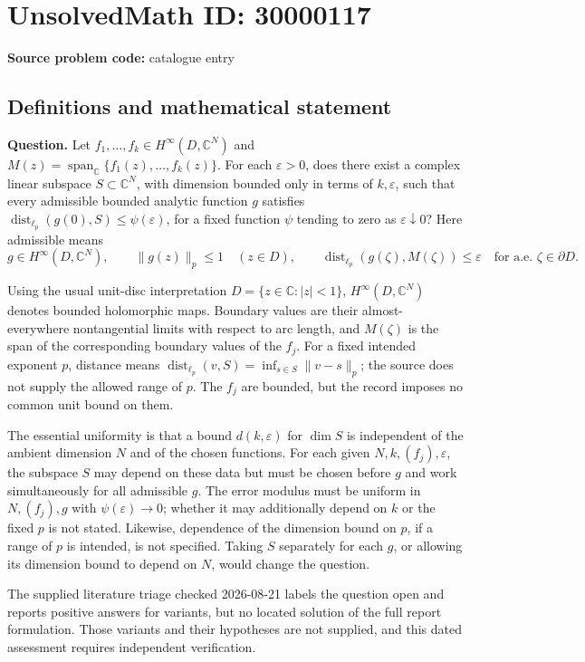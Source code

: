 \documentclass[11pt]{article}
\newcommand{\C}{\mathbb{C}}
\begin{document}
\section*{UnsolvedMath ID: 30000117}
\textbf{Source problem code:} catalogue entry
\subsection{Definitions and mathematical statement}
\textbf{Question.} Let \(f_1,\ldots,f_k\in H^\infty(D,\C^N)\) and \(M(z)=\operatorname{span}_{\C}\{f_1(z),\ldots,f_k(z)\}\). For each \(\varepsilon>0\), does there exist a complex linear subspace \(S\subset\C^N\), with dimension bounded only in terms of \(k,\varepsilon\), such that every admissible bounded analytic function \(g\) satisfies \(\operatorname{dist}_{\ell_p}(g(0),S)\le\psi(\varepsilon)\), for a fixed function \(\psi\) tending to zero as \(\varepsilon\downarrow0\)? Here admissible means\[g\in H^\infty(D,\C^N),\qquad \|g(z)\|_p\le1\quad(z\in D),\qquad \operatorname{dist}_{\ell_p}(g(\zeta),M(\zeta))\le\varepsilon\quad\text{for a.e. }\zeta\in\partial D.\]\par Using the usual unit-disc interpretation \(D=\{z\in\C:|z|<1\}\), \(H^\infty(D,\C^N)\) denotes bounded holomorphic maps. Boundary values are their almost-everywhere nontangential limits with respect to arc length, and \(M(\zeta)\) is the span of the corresponding boundary values of the \(f_j\). For a fixed intended exponent \(p\), distance means \(\operatorname{dist}_{\ell_p}(v,S)=\inf_{s\in S}\|v-s\|_p\); the source does not supply the allowed range of \(p\). The \(f_j\) are bounded, but the record imposes no common unit bound on them.\par The essential uniformity is that a bound \(d(k,\varepsilon)\) for \(\dim S\) is independent of the ambient dimension \(N\) and of the chosen functions. For each given \(N,k,(f_j),\varepsilon\), the subspace \(S\) may depend on these data but must be chosen before \(g\) and work simultaneously for all admissible \(g\). The error modulus must be uniform in \(N,(f_j),g\) with \(\psi(\varepsilon)\to0\); whether it may additionally depend on \(k\) or the fixed \(p\) is not stated. Likewise, dependence of the dimension bound on \(p\), if a range of \(p\) is intended, is not specified. Taking \(S\) separately for each \(g\), or allowing its dimension bound to depend on \(N\), would change the question.\par The supplied literature triage checked 2026-08-21 labels the question open and reports positive answers for variants, but no located solution of the full report formulation. Those variants and their hypotheses are not supplied, and this dated assessment requires independent verification.
\end{document}
